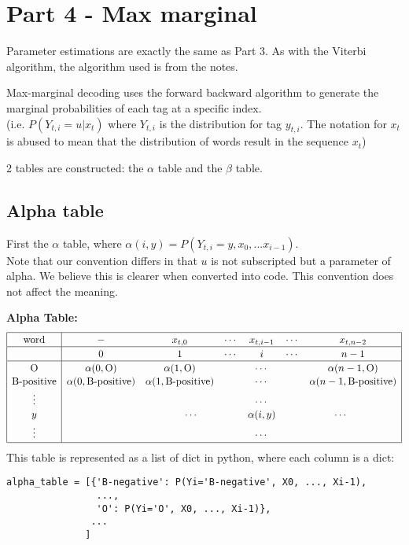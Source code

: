 \documentclass[12pt]{article}
\begin{document}
\pagebreak

\section{Part 4 - Max marginal}

Parameter estimations are exactly the same as Part 3. As with the Viterbi algorithm, the algorithm used is from the notes.

\bigskip

Max-marginal decoding uses the forward backward algorithm to generate the marginal probabilities of each tag at a specific index.\\
(i.e. \(P(Y_{t,i}=u | x_t)\) where \(Y_{t,i}\) is the distribution for tag \(y_{t,i}\). The notation for \(x_t\) is abused to mean that the distribution of words result in the sequence \(x_t\))

2 tables are constructed: the \(\alpha\) table and the \(\beta\) table.

\subsection{Alpha table}
First the \(\alpha\) table, where \(\alpha(i, y) = P(Y_{t,i}=y, x_0, ... x_{i-1})\).\\
Note that our convention differs in that \(u\) is not subscripted but a parameter of alpha. We believe this is clearer when converted into code. This convention does not affect the meaning.

\textbf{Alpha Table:}
\[
\begin{array}{|c|cccccc|}
\hline \rule{0pt}{1em}
\mbox{word} & - & x_{t,0} & \cdots & x_{t,i-1} & \cdots & x_{t,n-2} \\
\hline \rule{0pt}{1em}
& 0 & 1 & \cdots & i & \cdots & n-1 \\
\hline \rule{0pt}{1em}
\mbox{O}          & \alpha(0,\mbox{O}) & \alpha(1,\mbox{O}) & \multicolumn{3}{c}{\cdots} & \alpha(n-1,\mbox{O}) \\[0.1em]
\mbox{B-positive} & \alpha(0,\mbox{B-positive}) & \alpha(1,\mbox{B-positive}) & \multicolumn{3}{c}{\cdots} & \alpha(n-1,\mbox{B-positive}) \\[0.1em]
\vdots & &         & \multicolumn{3}{c}{\cdots} &            \\[0.1em]
y      & &\multicolumn{2}{c}{\cdots} & \alpha(i,y) & \multicolumn{2}{c|}{\cdots} \\[0.1em]
\vdots & &         & \multicolumn{3}{c}{\cdots} &            \\[0.1em]
\hline
\end{array}
\]
This table is represented as a list of dict in python, where each column is a dict:
\begin{verbatim}
alpha_table = [{'B-negative': P(Yi='B-negative', X0, ..., Xi-1),
                ...,
                'O': P(Yi='O', X0, ..., Xi-1)},
               ...
              ]
\end{verbatim}
\end{document}
